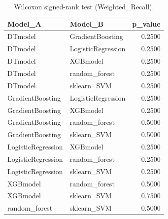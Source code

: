 \begin{table}[t]
\centering
\begin{tabular}{llr}
\toprule
Model_A & Model_B & p_value \\
\midrule
DTmodel & GradientBoosting & 0.2500 \\
DTmodel & LogisticRegression & 0.2500 \\
DTmodel & XGBmodel & 0.2500 \\
DTmodel & random_forest & 0.2500 \\
DTmodel & sklearn_SVM & 0.2500 \\
GradientBoosting & LogisticRegression & 0.2500 \\
GradientBoosting & XGBmodel & 0.2500 \\
GradientBoosting & random_forest & 0.5000 \\
GradientBoosting & sklearn_SVM & 0.5000 \\
LogisticRegression & XGBmodel & 0.2500 \\
LogisticRegression & random_forest & 0.2500 \\
LogisticRegression & sklearn_SVM & 0.2500 \\
XGBmodel & random_forest & 0.5000 \\
XGBmodel & sklearn_SVM & 0.7500 \\
random_forest & sklearn_SVM & 0.5000 \\
\bottomrule
\end{tabular}
\caption{Wilcoxon signed-rank test (Weighted_Recall).}
\label{tab:wilcoxon_Weighted_Recall}
\end{table}